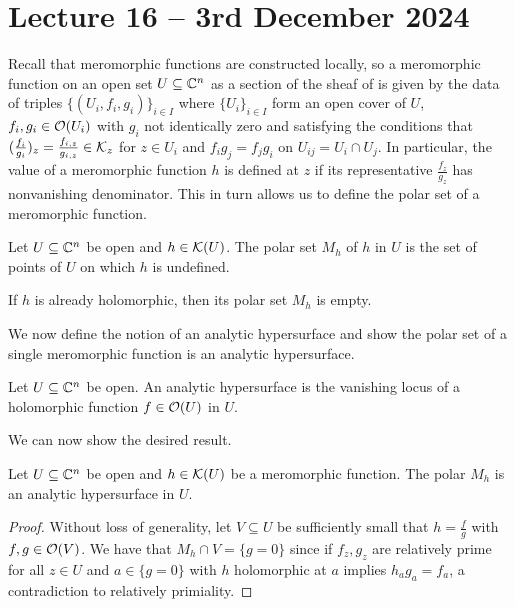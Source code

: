 \section{Lecture 16 -- 3rd December 2024}\label{sec: lecture 16}
Recall that meromorphic functions are constructed locally, so a meromorphic function on an open set $U\subseteq\mathbb{C}^{n}$ as a section of the sheaf of  is given by the data of triples $\{(U_{i},f_{i},g_{i})\}_{i\in I}$ where $\{U_{i}\}_{i\in I}$ form an open cover of $U$, $f_{i},g_{i}\in\mathcal{O}(U_{i})$ with $g_{i}$ not identically zero and satisfying the conditions that $(\frac{f_{i}}{g_{i}})_{z}=\frac{f_{i,z}}{g_{i,z}}\in\mathcal{K}_{z}$ for $z\in U_{i}$ and $f_{i}g_{j}=f_{j}g_{i}$ on $U_{ij}=U_{i}\cap U_{j}$. In particular, the value of a meromorphic function $h$ is defined at $z$ if its representative $\frac{f_{z}}{g_{z}}$ has nonvanishing denominator. This in turn allows us to define the polar set of a meromorphic function. 
\begin{definition}\label{def: polar set}
    Let $U\subseteq\mathbb{C}^{n}$ be open and $h\in\mathcal{K}(U)$. The polar set $M_{h}$ of $h$ in $U$ is the set of points of $U$ on which $h$ is undefined. 
\end{definition}
\begin{remark}
    If $h$ is already holomorphic, then its polar set $M_{h}$ is empty. 
\end{remark}
We now define the notion of an analytic hypersurface and show the polar set of a single meromorphic function is an analytic hypersurface. 
\begin{definition}\label{def: analytic hypersurface}
    Let $U\subseteq\mathbb{C}^{n}$ be open. An analytic hypersurface is the vanishing locus of a holomorphic function $f\in\mathcal{O}(U)$ in $U$. 
\end{definition}
We can now show the desired result. 
\begin{proposition}\label{prop: polar set of meromorphic function is analytic hypersurface}
    Let $U\subseteq\mathbb{C}^{n}$ be open and $h\in\mathcal{K}(U)$ be a meromorphic function. The polar $M_{h}$ is an analytic hypersurface in $U$. 
\end{proposition}
\begin{proof}
    Without loss of generality, let $V\subseteq U$ be sufficiently small that $h=\frac{f}{g}$ with $f,g\in\mathcal{O}(V)$. We have that $M_{h}\cap V=\{g=0\}$ since if $f_{z},g_{z}$ are relatively prime for all $z\in U$ and $a\in\{g=0\}$ with $h$ holomorphic at $a$ implies $h_{a}g_{a}=f_{a}$, a contradiction to relatively primiality. 
\end{proof}

